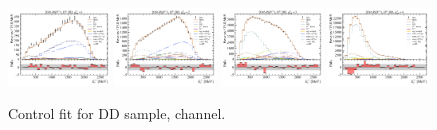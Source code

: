 \begin{figure}[!htb]
    \includegraphics[width=0.24\textwidth]{./figs-fit-fit-results/ctrl-fit/lines_q2_slices/fit_result-lines_q2_idx1-D0-dd-el.pdf}
    \includegraphics[width=0.24\textwidth]{./figs-fit-fit-results/ctrl-fit/lines_q2_slices/fit_result-lines_q2_idx2-D0-dd-el.pdf}
    \includegraphics[width=0.24\textwidth]{./figs-fit-fit-results/ctrl-fit/lines_q2_slices/fit_result-lines_q2_idx3-D0-dd-el.pdf}
    \includegraphics[width=0.24\textwidth]{./figs-fit-fit-results/ctrl-fit/lines_q2_slices/fit_result-lines_q2_idx4-D0-dd-el.pdf}

    \caption{Control fit for DD sample, \Dz channel.}
    \label{fig:ctrl-dd-d0}
\end{figure}

